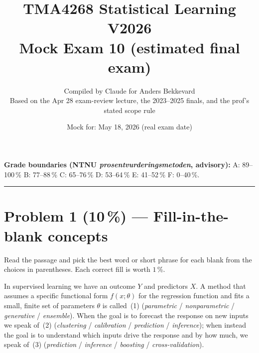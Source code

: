 \documentclass[11pt,a4paper]{article}
\title{TMA4268 Statistical Learning V2026\\[0.3em]
\large Mock Exam 10 (estimated final exam)}
\author{Compiled by Claude for Anders Bekkevard\\[0.2em]
\small Based on the Apr 28 exam-review lecture, the 2023--2025 finals, and the prof's stated scope rule}
\date{Mock for: May 18, 2026 (real exam date)}
\newcommand{\points}[1]{\textbf{(#1\,\%)}}
\begin{document}
\maketitle

\noindent{}

\vspace{0.6em}
\noindent\textbf{Grade boundaries (NTNU \emph{prosentvurderingsmetoden}, advisory):}
A: 89--100\,\% \quad B: 77--88\,\% \quad C: 65--76\,\% \quad D: 53--64\,\% \quad E: 41--52\,\% \quad F: 0--40\,\%.

\vspace{1em}
\hrule
\vspace{1em}

\section*{Problem 1 \points{10} --- Fill-in-the-blank concepts}

\noindent Read the passage and pick the best word or short phrase for each blank from the choices in parentheses. Each correct fill is worth $1$\,\%.

\bigskip

In supervised learning we have an outcome $Y$ and predictors $X$. A method that assumes a specific functional form $f(x;\theta)$ for the regression function and fits a small, finite set of parameters $\theta$ is called \underline{\hspace{2.5cm}}\,(1) (\emph{parametric} / \emph{nonparametric} / \emph{generative} / \emph{ensemble}). When the goal is to forecast the response on new inputs we speak of \underline{\hspace{2.5cm}}\,(2) (\emph{clustering} / \emph{calibration} / \emph{prediction} / \emph{inference}); when instead the goal is to understand which inputs drive the response and by how much, we speak of \underline{\hspace{2.5cm}}\,(3) (\emph{prediction} / \emph{inference} / \emph{boosting} / \emph{cross-validation}).
\end{document}
